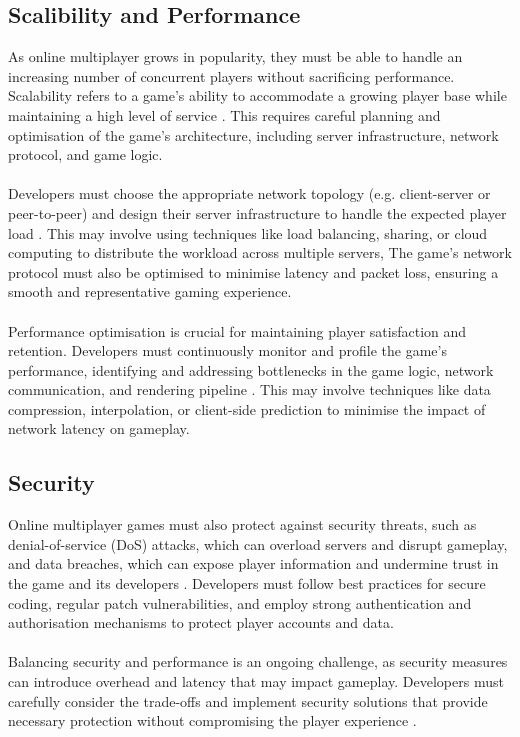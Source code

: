 \subsection{Scalibility and Performance}
As online multiplayer grows in popularity, they must be able to handle an increasing number of concurrent players without sacrificing performance. Scalability refers to a game's ability to accommodate a growing player base while maintaining a high level of service \cite{multiplayer-networking}. This requires careful planning and optimisation of the game's architecture, including server infrastructure, network protocol, and game logic.
\\
\noindent
\\
Developers must choose the appropriate network topology (e.g. client-server or peer-to-peer) and design their server infrastructure to handle the expected player load \cite{network-architecting}. This may involve using techniques like load balancing, sharing, or cloud computing to distribute the workload across multiple servers, The game's network protocol must also be optimised to minimise latency and packet loss, ensuring a smooth and representative gaming experience.
\\
\noindent
\\
Performance optimisation is crucial for maintaining player satisfaction and retention. Developers must continuously monitor and profile the game's performance, identifying and addressing bottlenecks in the game logic, network communication, and rendering pipeline \cite{develop-unity}. This may involve techniques like data compression, interpolation, or client-side prediction to minimise the impact of network latency on gameplay. 

\subsection{Security}
Online multiplayer games must also protect against security threats, such as denial-of-service (DoS) attacks, which can overload servers and disrupt gameplay, and data breaches, which can expose player information and undermine trust in the game and its developers \cite{multiplayer-networking}. Developers must follow best practices for secure coding, regular patch vulnerabilities, and employ strong authentication and authorisation mechanisms to protect player accounts and data.
\\
\noindent
\\
Balancing security and performance is an ongoing challenge, as security measures can introduce overhead and latency that may impact gameplay. Developers must carefully consider the trade-offs and implement security solutions that provide necessary protection without compromising the player experience \cite{network-architecting}. 

